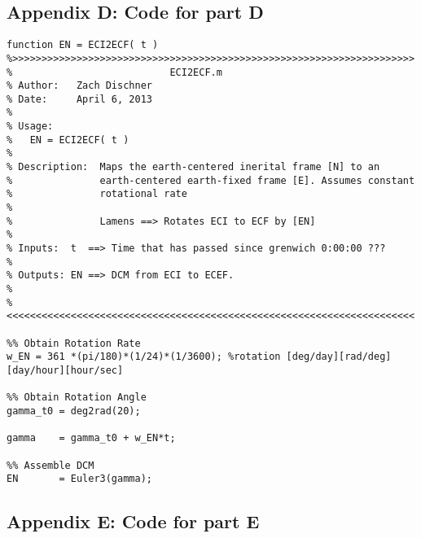 \documentclass[]{aiaa-tc}%
\begin{document}
\subsection{Appendix D: Code for part D}

\label{APP:Code for Part D}
\begin{lstlisting}
function EN = ECI2ECF( t )
%>>>>>>>>>>>>>>>>>>>>>>>>>>>>>>>>>>>>>>>>>>>>>>>>>>>>>>>>>>>>>>>>>>>>> 
%                           ECI2ECF.m
% Author:   Zach Dischner
% Date:     April 6, 2013
% 
% Usage:
%   EN = ECI2ECF( t )
%
% Description:  Maps the earth-centered inerital frame [N] to an
%               earth-centered earth-fixed frame [E]. Assumes constant
%               rotational rate
% 
%               Lamens ==> Rotates ECI to ECF by [EN]
% 
% Inputs:  t  ==> Time that has passed since grenwich 0:00:00 ???
%
% Outputs: EN ==> DCM from ECI to ECEF.
% 
%<<<<<<<<<<<<<<<<<<<<<<<<<<<<<<<<<<<<<<<<<<<<<<<<<<<<<<<<<<<<<<<<<<<<<<

%% Obtain Rotation Rate
w_EN = 361 *(pi/180)*(1/24)*(1/3600); %rotation [deg/day][rad/deg][day/hour][hour/sec]

%% Obtain Rotation Angle
gamma_t0 = deg2rad(20);

gamma    = gamma_t0 + w_EN*t;

%% Assemble DCM
EN       = Euler3(gamma);
\end{lstlisting}


\subsection{Appendix E: Code for part E}
\end{document}
